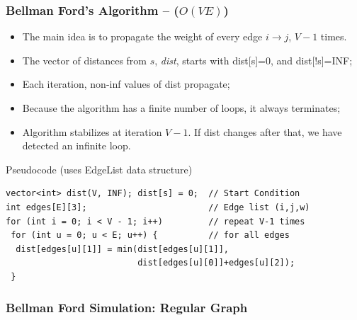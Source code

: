 \begin{frame}[fragile]
  \frametitle{Bellman Ford's Algorithm -- ($O(VE)$)}
  {\smaller
  \begin{itemize}
    \item The main idea is to propagate the weight of every edge $i\to j$, $V-1$ times.

    \item The vector of distances from $s$, \emph{dist}, starts with dist[s]=0, and dist[!s]=INF;

    \item Each iteration, non-inf values of dist propagate;

    \item Because the algorithm has a finite number of loops, it always terminates;
    \item Algorithm stabilizes at iteration $V-1$. If dist changes after that, we have detected an infinite loop.
  \end{itemize}

  \begin{exampleblock}{Pseudocode (uses EdgeList data structure)}
\begin{verbatim}
vector<int> dist(V, INF); dist[s] = 0;  // Start Condition
int edges[E][3];                        // Edge list (i,j,w)
for (int i = 0; i < V - 1; i++)         // repeat V-1 times
 for (int u = 0; u < E; u++) {          // for all edges
  dist[edges[u][1]] = min(dist[edges[u][1]],
                          dist[edges[u][0]]+edges[u][2]);
 }
\end{verbatim}
\end{exampleblock}}
\end{frame}

\begin{frame}
  \frametitle{Bellman Ford Simulation: Regular Graph}
  \begin{center}
  \end{center}
  \vspace{10cm}
\end{frame}

